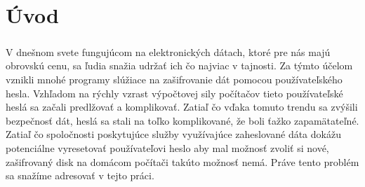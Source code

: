 \chapter*{Úvod}
\paragraph{}
V dnešnom svete fungujúcom na elektronických dátach, ktoré pre nás majú obrovskú cenu, sa ľudia snažia udržať ich čo najviac v tajnosti. Za týmto účelom vznikli mnohé programy slúžiace na zašifrovanie dát pomocou používateľského hesla. Vzhľadom na rýchly vzrast výpočtovej sily počítačov tieto používateľské heslá sa začali predlžovať a komplikovať. Zatiaľ čo vďaka tomuto trendu sa zvýšili bezpečnosť dát, heslá sa stali na toľko komplikované, že boli ťažko zapamätateľné. Zatiaľ čo spoločnosti poskytujúce služby využívajúce zaheslované dáta dokážu potenciálne vyresetovať používateľovi heslo aby mal možnosť zvoliť si nové, zašifrovaný disk na domácom počítači takúto možnosť nemá. Práve tento problém sa snažíme adresovať v tejto práci.